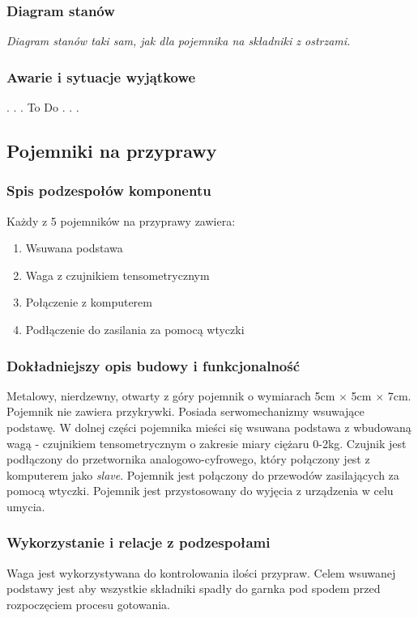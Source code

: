 \documentclass[12pt,a4paper,notitlepage]{report}
\begin{document}
\subsubsection{Diagram stanów}
\emph{Diagram stanów taki sam, jak dla pojemnika na składniki z ostrzami.}

\subsubsection{Awarie i sytuacje wyjątkowe}
. . . To Do . . .



\subsection{Pojemniki na przyprawy}
\subsubsection{Spis podzespołów komponentu}
Każdy z 5 pojemników na przyprawy zawiera:
\begin{enumerate}
  \item Wsuwana podstawa
  \item Waga z czujnikiem tensometrycznym
  \item Połączenie z komputerem
  \item Podłączenie do zasilania za pomocą wtyczki
\end{enumerate}

\subsubsection{Dokładniejszy opis budowy i funkcjonalność}
Metalowy, nierdzewny, otwarty z góry pojemnik o wymiarach 5cm $\times$ 5cm $\times$ 7cm. Pojemnik nie zawiera przykrywki. Posiada serwomechanizmy wsuwające podstawę. W dolnej części pojemnika mieści się wsuwana podstawa z wbudowaną wagą - czujnikiem tensometrycznym o zakresie miary ciężaru 0-2kg. Czujnik jest podłączony do przetwornika analogowo-cyfrowego, który połączony jest z komputerem jako \emph{slave}. Pojemnik jest połączony do przewodów zasilających za pomocą wtyczki. Pojemnik jest przystosowany do wyjęcia z urządzenia w celu umycia.
 
\subsubsection{Wykorzystanie i relacje z podzespołami}
Waga jest wykorzystywana do kontrolowania ilości przypraw. Celem wsuwanej podstawy jest aby wszystkie składniki spadły do garnka pod spodem przed rozpoczęciem procesu gotowania.
\end{document}
